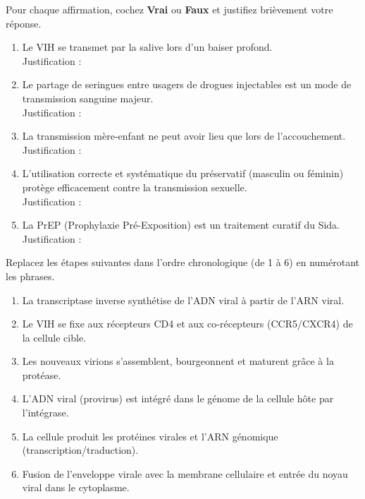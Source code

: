 \documentclass[11pt]{article}
\begin{document}
\begin{exercice}
Pour chaque affirmation, cochez \textbf{Vrai} ou \textbf{Faux} et justifiez brièvement votre réponse.
\begin{enumerate}
\item Le VIH se transmet par la salive lors d'un baiser profond. \hfill {} \hspace{0.5cm}  \\
Justification : \dotfill
\item Le partage de seringues entre usagers de drogues injectables est un mode de transmission sanguine majeur. \hfill {} \hspace{0.5cm}  \\
Justification : \dotfill
\item La transmission mère-enfant ne peut avoir lieu que lors de l'accouchement. \hfill {} \hspace{0.5cm}  \\
Justification : \dotfill
\item L'utilisation correcte et systématique du préservatif (masculin ou féminin) protège efficacement contre la transmission sexuelle. \hfill {} \hspace{0.5cm}  \\
Justification : \dotfill
\item La PrEP (Prophylaxie Pré-Exposition) est un traitement curatif du Sida. \hfill {} \hspace{0.5cm}  \\
Justification : \dotfill
\end{enumerate}
\end{exercice}

\begin{exercice}
Replacez les étapes suivantes dans l'ordre chronologique (de 1 à 6) en numérotant les phrases.
\begin{enumerate}
\item \dotfill La transcriptase inverse synthétise de l'ADN viral à partir de l'ARN viral.
\item \dotfill Le VIH se fixe aux récepteurs CD4 et aux co-récepteurs (CCR5/CXCR4) de la cellule cible.
\item \dotfill Les nouveaux virions s'assemblent, bourgeonnent et maturent grâce à la protéase.
\item \dotfill L'ADN viral (provirus) est intégré dans le génome de la cellule hôte par l'intégrase.
\item \dotfill La cellule produit les protéines virales et l'ARN génomique (transcription/traduction).
\item \dotfill Fusion de l'enveloppe virale avec la membrane cellulaire et entrée du noyau viral dans le cytoplasme.
\end{enumerate}
\end{exercice}
\end{document}
